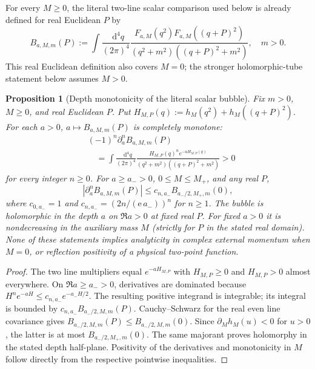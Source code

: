 \documentclass[final,5p,times,twocolumn,numbers,nopreprintline]{elsarticle}
\numberwithin{equation}{section}
\newtheorem{proposition}[theorem]{Proposition}
\theoremstyle{definition}
\theoremstyle{remark}
\newcommand{\dd}{\mathop{}\!\mathrm d}
\begin{document}
For every $M\geq0$, the literal two-line scalar comparison
used below is already defined for real Euclidean $P$ by
\begin{equation}
 B_{a,M,m}(P):=\int\frac{\dd^4q}{(2\pi)^4}
 \frac{F_{a,M}(q^2)F_{a,M}((q+P)^2)}
 {(q^2+m^2)((q+P)^2+m^2)},\quad m>0.
 \label{eq:OQED-literal-depth-bubble}
\end{equation}
This real Euclidean definition also covers $M=0$; the stronger
holomorphic-tube statement below assumes $M>0$.


\begin{proposition}[Depth monotonicity of the literal scalar bubble]
\label{prop:OQED-bubble-depth-monotone}
Fix $m>0$, $M\geq0$, and real Euclidean $P$. Put
$H_{M,P}(q):=h_M(q^2)+h_M((q+P)^2)$. For each $a>0$,
$a\mapsto B_{a,M,m}(P)$ is completely monotone:
\begin{equation}
 \begin{aligned}
 &(-1)^n\partial_a^n B_{a,M,m}(P)\\
 &\quad=\int\frac{\dd^4q}{(2\pi)^4}
 \frac{H_{M,P}(q)^n e^{-aH_{M,P}(q)}}
 {(q^2+m^2)((q+P)^2+m^2)}>0
 \end{aligned}
 \label{eq:OQED-bubble-depth-derivatives}
\end{equation}
for every integer $n\geq0$. For $a\geq a_->0$,
$0\leq M\leq M_+$, and any real $P$,
\begin{equation}
 |\partial_a^nB_{a,M,m}(P)|\leq
 c_{n,a_-}B_{a_-/2,M_+,m}(0),
 \label{eq:OQED-bubble-depth-uniform}
\end{equation}
where $c_{0,a_-}=1$ and
$c_{n,a_-}=(2n/(\mathrm e\,a_-))^n$ for $n\geq1$.
The bubble is holomorphic in the \emph{depth} $a$ on
$\Re a>0$ at fixed real $P$. For fixed $a>0$ it is
nondecreasing in the auxiliary mass $M$ (strictly for
$P$ in the stated real domain). None of these statements
implies analyticity in complex external momentum when $M=0$,
or reflection positivity of a physical two-point function.
\end{proposition}
\begin{proof}
The two line multipliers equal $e^{-aH_{M,P}}$ with
$H_{M,P}\geq0$ and $H_{M,P}>0$ almost everywhere. On
$\Re a\geq a_->0$, derivatives are dominated because
$H^n e^{-aH}\leq c_{n,a_-}e^{-a_-H/2}$.
The resulting positive integrand is integrable; its integral
is bounded by $c_{n,a_-}B_{a_-/2,M,m}(P)$.
Cauchy--Schwarz for the real even line covariance gives
$B_{a_-/2,M,m}(P)\leq B_{a_-/2,M,m}(0)$.
Since $\partial_Mh_M(u)<0$ for $u>0$, the latter is at
most $B_{a_-/2,M_+,m}(0)$. The same majorant proves
holomorphy in the stated depth half-plane. Positivity
of the derivatives and monotonicity in $M$ follow directly
from the respective pointwise inequalities.
\end{proof}
\end{document}
